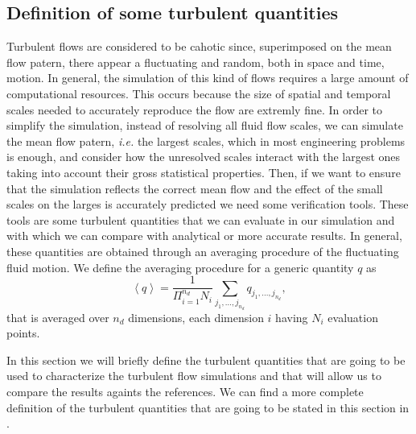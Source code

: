 \subsection{Definition of some turbulent quantities}
Turbulent flows are considered to be cahotic since, superimposed on the mean flow patern, there appear a fluctuating and random, both in space and time, motion. In general, the simulation of this kind of flows requires a large amount of computational resources. This occurs because the size of spatial and temporal scales needed to accurately reproduce the flow are extremly fine. In order to simplify the simulation, instead of resolving all fluid flow scales, we can simulate the mean flow patern, \textit{i.e.} the largest scales, which in most engineering problems is enough, and consider how the unresolved scales interact with the largest ones taking into account their gross statistical properties. Then, if we want to ensure that the simulation reflects the correct mean flow and the effect of the small scales on the larges is accurately predicted we need some verification tools. These tools are some turbulent quantities that we can evaluate in our simulation and with which we can compare with analytical or more accurate results. In general, these quantities are obtained through an averaging procedure of the fluctuating fluid motion. We define the averaging procedure for a generic quantity $q$ as
$$\left\langle q\right\rangle=\frac{1}{\Pi_{i=1}^{n_d}N_i}\sum_{j_1,...,j_{n_d}}q_{j_1,...,j_{n_d}},$$
that is averaged over $n_d$ dimensions, each dimension $i$ having $N_i$ evaluation points. 

In this section we will briefly define the turbulent quantities that are going to be used to characterize the turbulent flow simulations and that will allow us to compare the results againts the references. We can find a more complete definition of the turbulent quantities that are going to be stated in this section in \cite{orlandi_fluid_2012,pope_turbulent_2000,davidson_turbulence:_2004}.

